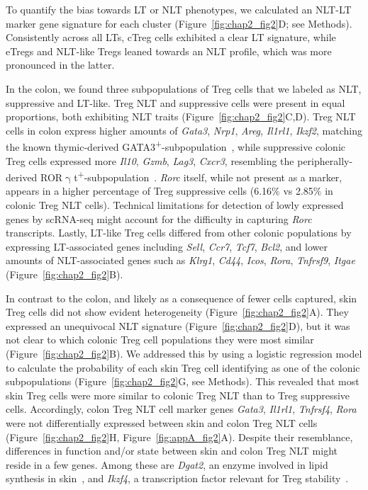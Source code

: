 To quantify the bias towards LT or NLT phenotypes, we calculated an NLT-LT marker gene signature for each cluster (Figure~\ref{fig:chap2_fig2}D; see Methods). Consistently across all LTs, cTreg cells exhibited a clear LT signature, while eTregs and NLT-like Tregs leaned towards an NLT profile, which was more pronounced in the latter. 

In the colon, we found three subpopulations of Treg cells that we labeled as NLT, suppressive and LT-like. Treg NLT and suppressive cells were present in equal proportions, both exhibiting NLT traits (Figure~\ref{fig:chap2_fig2}C,D). Treg NLT cells in colon express higher amounts of \textit{Gata3}, \textit{Nrp1}, \textit{Areg}, \textit{Il1rl1}, \textit{Ikzf2}, matching the known thymic-derived GATA3\textsuperscript{+}-subpopulation~\citep{Schiering2014-ry,Hu2015-yc}, while suppressive colonic Treg cells expressed more \textit{Il10}, \textit{Gzmb}, \textit{Lag3}, \textit{Cxcr3}, resembling the peripherally-derived ROR${\upgamma}$t\textsuperscript{+}-subpopulation~\citep{Ohnmacht2015-mo,Schiering2014-ry,Sefik2015-jq}. \textit{Rorc} itself, while not present as a marker, appears in a higher percentage of Treg suppressive cells (6.16${\%}$ vs 2.85${\%}$ in colonic Treg NLT cells). Technical limitations for detection of lowly expressed genes by scRNA-seq might account for the difficulty in capturing \textit{Rorc} transcripts. Lastly, LT-like Treg cells differed from other colonic populations by expressing LT-associated genes including \textit{Sell}, \textit{Ccr7}, \textit{Tcf7}, \textit{Bcl2}, and lower amounts of NLT-associated genes such as \textit{Klrg1}, \textit{Cd44}, \textit{Icos}, \textit{Rora}, \textit{Tnfrsf9}, \textit{Itgae} (Figure~\ref{fig:chap2_fig2}B).

In contrast to the colon, and likely as a consequence of fewer cells captured, skin Treg cells did not show evident heterogeneity (Figure~\ref{fig:chap2_fig2}A). They expressed an unequivocal NLT signature (Figure~\ref{fig:chap2_fig2}D), but it was not clear to which colonic Treg cell populations they were most similar (Figure~\ref{fig:chap2_fig2}B). We addressed this by using a logistic regression model to calculate the probability of each skin Treg cell identifying as one of the colonic subpopulations (Figure~\ref{fig:chap2_fig2}G, see Methods). This revealed that most skin Treg cells were more similar to colonic Treg NLT than to Treg suppressive cells. Accordingly, colon Treg NLT cell marker genes \textit{Gata3}, \textit{Il1rl1}, \textit{Tnfrsf4}, \textit{Rora} were not differentially expressed between skin and colon Treg NLT cells (Figure~\ref{fig:chap2_fig2}H, Figure~\ref{fig:appA_fig2}A). Despite their resemblance, differences in function and/or state between skin and colon Treg NLT might reside in a few genes. Among these are \textit{Dgat2}, an enzyme involved in lipid synthesis in skin~\citep{Fagerberg2014-pj}, and \textit{Ikzf4}, a transcription factor relevant for Treg stability~\citep{Sharma2013-ou}.

